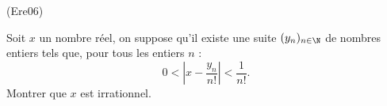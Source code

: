 \begin{tiny}(Ere06)\end{tiny} Soit $x$ un nombre r{\'e}el, on suppose qu'il existe une suite $(y_{n})_{n\in \N}$ de nombres entiers tels que, pour tous
les entiers $n$ :
\[
0<\left| x-\frac{y_{n}}{n!}\right| <\frac{1}{n!}.
\]
Montrer que $x$ est irrationnel.